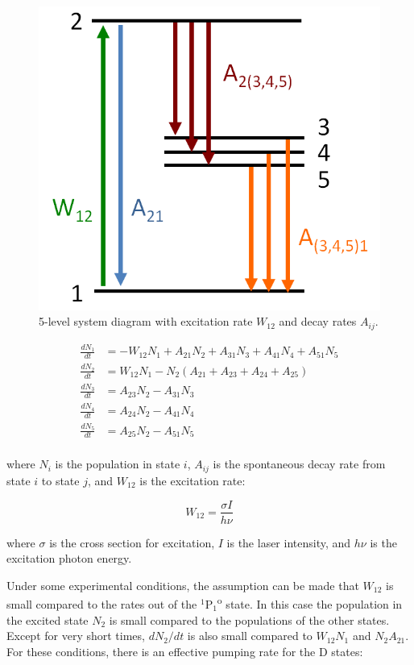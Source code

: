 \begin{figure} %
        \centering
                \includegraphics[width=.4\textwidth]{figures/5-level_general.png}
                \caption{5-level system diagram with excitation rate $W_{12}$ and decay rates $A_{ij}$.}
\label{fig:5lev}
\end{figure}


\begin{equation}
\begin{aligned}
\frac{dN_1}{dt} &= - W_{12}N_{1} + A_{21}N_{2} + A_{31}N_{3} + A_{41}N_{4} + A_{51} N_{5} \\
\frac{dN_2}{dt} &= W_{12}N_{1} - N_{2}(A_{21} + A_{23} + A_{24} + A_{25}) \\
\frac{dN_3}{dt} &= A_{23}N_{2} - A_{31}N_{3} \\
\frac{dN_4}{dt} &= A_{24}N_{2} - A_{41}N_{4} \\
\frac{dN_5}{dt} &= A_{25}N_{2} - A_{51}N_{5} \\
\end{aligned}
\label{eqn:rateEqn}
\end{equation}

\noindent
where $N_{i}$ is the population in state $i$, $A_{ij}$ is the spontaneous decay rate from state $i$ to state $j$, and $W_{12}$ is the excitation rate:

\begin{equation}
W_{12} =  \frac{\sigma I}{h \nu}
\label{eqn:w12}
\end{equation}

\noindent
where $\sigma$ is the cross section for excitation, $I$ is the laser intensity, and $h \nu$ is the excitation photon energy.

Under some experimental conditions, the assumption can be made that $W_{12}$ is small compared to the rates out of the $^{1}$P$_{1}$\textsuperscript{o} state.  In this case the population in the excited state $N_{2}$ is small compared to the populations of the other states.  Except for very short times, $dN_2/dt$ is also small compared to $W_{12} N_1$ and $N_2 A_{21}$.  For these conditions, there is an effective pumping rate for the D states:


